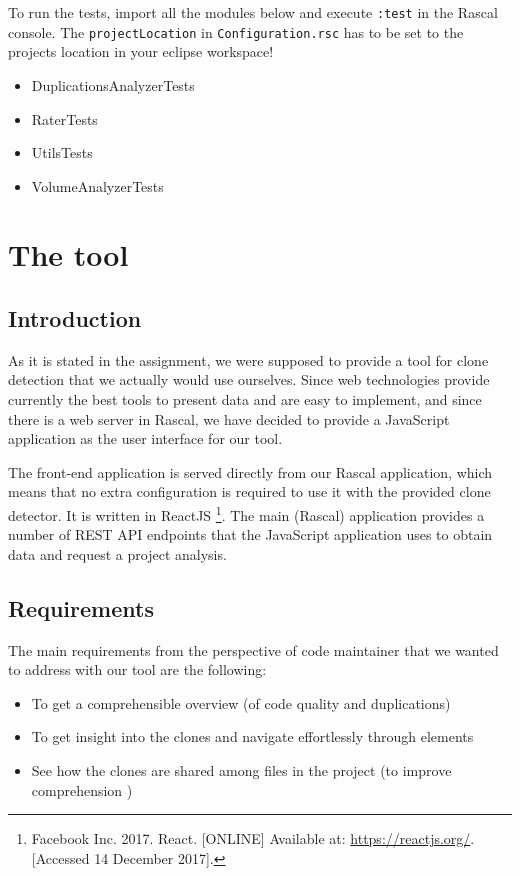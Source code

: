 \documentclass{uva-inf-article}
\begin{document}
To run the tests, import all the modules below and execute \texttt{:test} in the Rascal console. The \texttt{projectLocation} in \texttt{Configuration.rsc} has to be set to the projects location in your eclipse workspace!

\begin{itemize}

\item
  DuplicationsAnalyzerTests
\item
  RaterTests
\item
  UtilsTests
\item
  VolumeAnalyzerTests
\end{itemize}


\section{The tool}

\subsection{Introduction}
As it is stated in the assignment, we were supposed to provide a tool for clone detection that we actually would use ourselves.  Since web technologies provide currently the best tools to present data and are easy to implement, and since there is a web server in Rascal, we have decided to provide a JavaScript application as the user interface for our tool. 

The front-end application is served directly from our Rascal application, which means that no extra configuration is required to use it with the provided clone detector. It is written in ReactJS \footnote{Facebook Inc. 2017. React. [ONLINE] Available at: \url{https://reactjs.org/}. [Accessed 14 December 2017].
}. The main (Rascal) application provides a number of REST API endpoints that the JavaScript application uses to obtain data and request a project analysis. 

\subsection{Requirements}
The main requirements from the perspective of code maintainer that we wanted to address with our tool are the following: 

\begin{itemize}
    \item{To get a comprehensible overview (of code quality and duplications)}
    \item{To get insight into the clones and navigate effortlessly through elements}
    \item{See how the clones are shared among files in the project (to improve comprehension ) }
\end{itemize}
\end{document}
